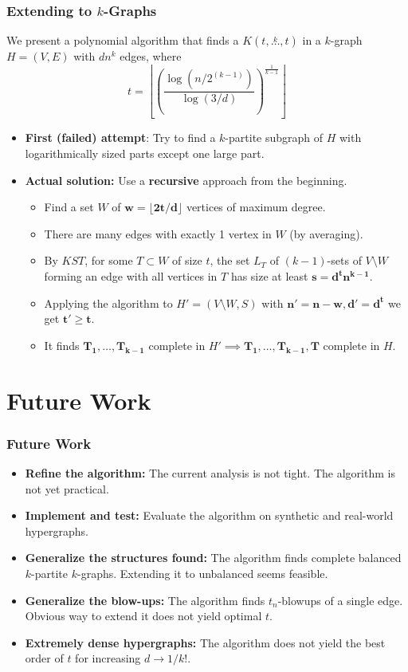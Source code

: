 \documentclass[aspectratio=169]{beamer}
\newcommand{\compoverset}[2]{\ensuremath{K\left(#2, \overset{#1}{\dots}, #2\right)}} %
\theoremstyle{mystyle}
\begin{document}
\begin{frame}
    \frametitle{Extending to $k$-Graphs}
    We present a polynomial algorithm that finds a $\compoverset{k}{t}$ in a $k$-graph $H = (V, E)$ with $d n^k$ edges, where
    \[
        t = \left\lfloor \left(  \frac{\log \left(n/2^{(k-1)}\right)}{\log (3/d)} \right)^{\frac{1}{k-1}} \right\rfloor
    \]
    \begin{itemize}
        \item<1->\textbf{First (failed) attempt}: Try to find a $k$-partite subgraph of $H$ with logarithmically sized parts except one large part.
        \item<2->\textbf{Actual solution:} Use a \textbf{recursive} approach from the beginning.
        \begin{itemize}
            \item<3-> Find a set $W$ of $\mathbf{w = \lfloor 2t / d \rfloor}$ vertices of maximum degree.
            \item<4-> There are many edges with exactly 1 vertex in $W$ (by averaging).
            \item<5-> By $KST$, for some $T \subset W$ of size $t$, the set $L_T$ of $(k-1)$-sets of $V \setminus W$
            forming an edge with all vertices in $T$ has size at least $\mathbf{s = d^t n^{k-1}}$.
            \item<6-> Applying the algorithm to $H' = (V \setminus W, S)$ with $\mathbf{n' = n-w, d' = d^t}$
            we get $\mathbf{t' \geq t}$.
            \item<7-> It finds $\mathbf{T_1, \dots, T_{k-1}}$ complete in $H' \implies \mathbf{T_1, \dots, T_{k-1}, T}$ complete in $H$.
        \end{itemize}
    \end{itemize}
\end{frame}
    
\section{Future Work}\label{sec:future-work}

\begin{frame}
    \frametitle{Future Work}
    \begin{itemize}
        \item<2-> \textbf{Refine the algorithm:} The current analysis is not tight.
        The algorithm is not yet practical.
        \item<3-> \textbf{Implement and test:} Evaluate the algorithm on synthetic and real-world hypergraphs.
        \item<4-> \textbf{Generalize the structures found:} The algorithm finds complete balanced $k$-partite $k$-graphs.
        Extending it to unbalanced seems feasible.
        \item<5-> \textbf{Generalize the blow-ups:} The algorithm finds $t_n$-blowups of a single edge.
        Obvious way to extend it does not yield optimal $t$.
        \item<6-> \textbf{Extremely dense hypergraphs:} The algorithm does not yield the best order of $t$ for increasing $d \to 1/k!$.
    \end{itemize}
\end{frame}
\end{document}
